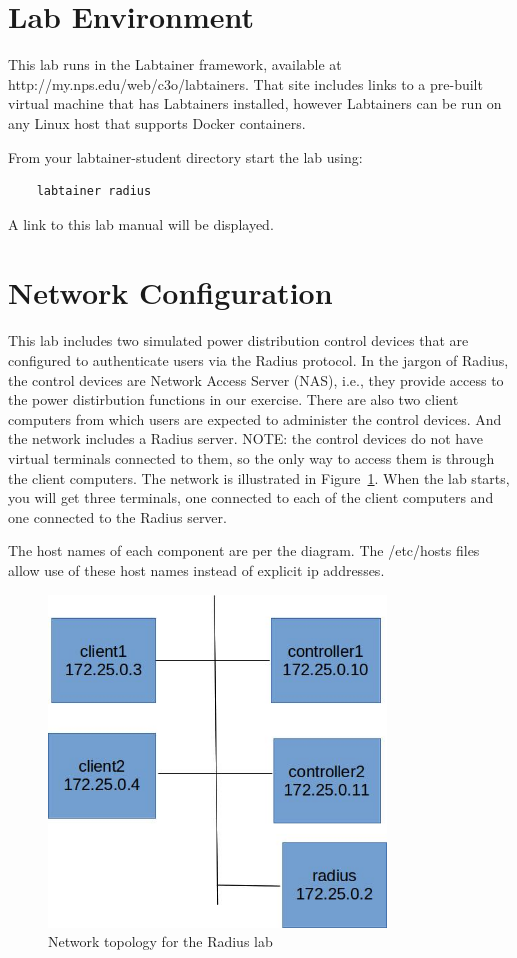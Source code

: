 \section{Lab Environment}
This lab runs in the Labtainer framework,
available at http://my.nps.edu/web/c3o/labtainers.
That site includes links to a pre-built virtual machine
that has Labtainers installed, however Labtainers can
be run on any Linux host that supports Docker containers.

From your labtainer-student directory start the lab using:
\begin{verbatim}
    labtainer radius
\end{verbatim}
\noindent A link to this lab manual will be displayed.  

\section{Network Configuration}
This lab includes two simulated power distribution control devices that
are configured to authenticate users via the Radius protocol.  In the jargon
of Radius, the control devices are Network Access Server (NAS), i.e., they
provide access to the power distirbution functions in our exercise. There
are also two client computers from which users are expected to administer
the control devices.  
And the network includes a Radius server.  NOTE: the control devices
do not have virtual terminals connected to them, so the only way to 
access them is through the client computers.  The network is
illustrated in Figure~\ref{fig:topology}.
When the lab starts, you will get three terminals, one connected to each
of the client computers and one connected to the Radius server.

The host names of each component are per the diagram.  The /etc/hosts files
allow use of these host names instead of explicit ip addresses.

\begin{figure}[H]
\begin{center}
\includegraphics [width=0.8\textwidth]{radius.jpg}
\end{center}
\caption{Network topology for the Radius lab}
\label{fig:topology}
\end{figure}

